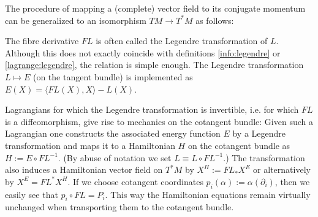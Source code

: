     The procedure of mapping a (complete) vector field to its conjugate momentum can be generalized to an isomorphism $TM\rightarrow T^*M$ as follows:
    \begin{remark}
        The fibre derivative $FL$ is often called the Legendre transformation of $L$. Although this does not exactly coincide with definitions \ref{info:legendre} or \ref{lagrange:legendre}, the relation is simple enough. The Legendre transformation $L\mapsto E$ (on the tangent bundle) is implemented as $E(X) = \langle FL(X), X\rangle - L(X)$.
    \end{remark}
    Lagrangians for which the Legendre transformation is invertible, i.e. for which $FL$ is a diffeomorphism, give rise to mechanics on the cotangent bundle: Given such a Lagrangian one constructs the associated energy function $E$ by a Legendre transformation and maps it to a Hamiltonian $H$ on the cotangent bundle as $H:=E\circ FL^{-1}$. (By abuse of notation we set $L\equiv L\circ FL^{-1}$.) The transformation also induces a Hamiltonian vector field on $T^*M$ by $X^H:=FL_*X^E$ or alternatively by $X^E=FL^*X^H$. If we choose cotangent coordinates $p_i(\alpha) := \alpha(\partial_i)$, then we easily see that $p_i\circ FL=P_i$. This way the Hamiltonian equations remain virtually unchanged when transporting them to the cotangent bundle.


